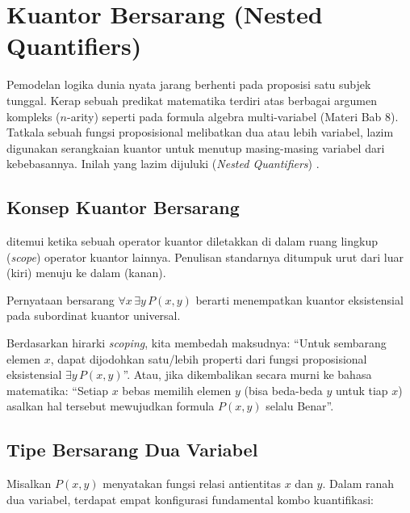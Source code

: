 \section{Kuantor Bersarang (Nested Quantifiers)}

Pemodelan logika dunia nyata jarang berhenti pada proposisi satu subjek tunggal. Kerap sebuah predikat matematika terdiri atas berbagai argumen kompleks ($n$-arity) seperti pada formula algebra multi-variabel (Materi Bab 8). Tatkala sebuah fungsi proposisional melibatkan dua atau lebih variabel, lazim digunakan serangkaian kuantor untuk menutup masing-masing variabel dari kebebasannya. Inilah yang lazim dijuluki  (\textit{Nested Quantifiers}) \cite{rosen2019}.

\subsection{Konsep Kuantor Bersarang}

\begin{definisi}
 ditemui ketika sebuah operator kuantor diletakkan di dalam ruang lingkup (\textit{scope}) operator kuantor lainnya. Penulisan standarnya ditumpuk urut dari luar (kiri) menuju ke dalam (kanan).
\end{definisi}

Pernyataan bersarang $\forall x \, \exists y \, P(x, y)$ berarti menempatkan kuantor eksistensial pada subordinat kuantor universal.

Berdasarkan hirarki \textit{scoping}, kita membedah maksudnya: ``Untuk sembarang elemen $x$, dapat dijodohkan satu/lebih properti dari fungsi proposisional eksistensial $\exists y \, P(x, y)$''. Atau, jika dikembalikan secara murni ke bahasa matematika:
``Setiap $x$ bebas memilih elemen $y$ (bisa beda-beda $y$ untuk tiap $x$) asalkan hal tersebut mewujudkan formula $P(x, y)$ selalu Benar''.

\subsection{Tipe Bersarang Dua Variabel}

Misalkan $P(x, y)$ menyatakan fungsi relasi antientitas $x$ dan $y$. Dalam ranah dua variabel, terdapat empat konfigurasi fundamental kombo kuantifikasi:

